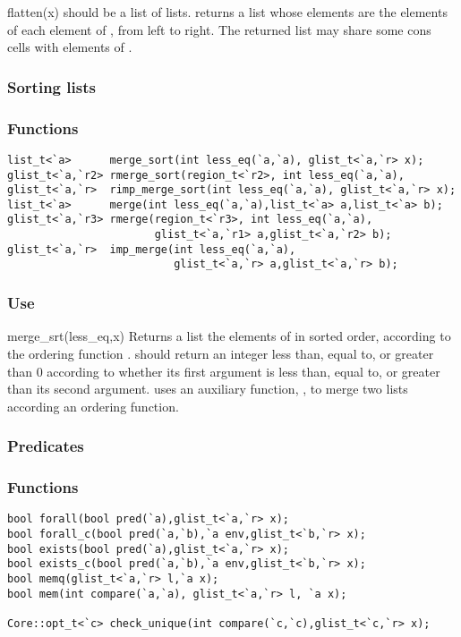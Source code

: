 \begin{defun}{flatten}{(x)}
 should be a list of lists.   returns a list whose
elements are the elements of each element of , from left to
right.  The returned list may share some cons cells with elements of
.
\end{defun}

\subsubsection*{Sorting lists}
\subsubsection*{Functions}
\begin{verbatim}
list_t<`a>      merge_sort(int less_eq(`a,`a), glist_t<`a,`r> x);
glist_t<`a,`r2> rmerge_sort(region_t<`r2>, int less_eq(`a,`a),
glist_t<`a,`r>  rimp_merge_sort(int less_eq(`a,`a), glist_t<`a,`r> x);
list_t<`a>      merge(int less_eq(`a,`a),list_t<`a> a,list_t<`a> b);
glist_t<`a,`r3> rmerge(region_t<`r3>, int less_eq(`a,`a),
                       glist_t<`a,`r1> a,glist_t<`a,`r2> b);
glist_t<`a,`r>  imp_merge(int less_eq(`a,`a),
                          glist_t<`a,`r> a,glist_t<`a,`r> b);
\end{verbatim}

\subsubsection*{Use}

\begin{defun}{merge_srt}{(less_eq,x)}
Returns a list the elements of  in sorted order, according to the
ordering function .   should return an integer
less than, equal to, or greater than 0 according to whether its first
argument is less than, equal to, or greater than its second argument.
 uses an auxiliary function,
, to merge two lists
according an ordering function.
\end{defun}

\subsubsection*{Predicates}
\subsubsection*{Functions}
\begin{verbatim}
bool forall(bool pred(`a),glist_t<`a,`r> x);
bool forall_c(bool pred(`a,`b),`a env,glist_t<`b,`r> x);
bool exists(bool pred(`a),glist_t<`a,`r> x);
bool exists_c(bool pred(`a,`b),`a env,glist_t<`b,`r> x);
bool memq(glist_t<`a,`r> l,`a x);
bool mem(int compare(`a,`a), glist_t<`a,`r> l, `a x);

Core::opt_t<`c> check_unique(int compare(`c,`c),glist_t<`c,`r> x);
\end{verbatim}

